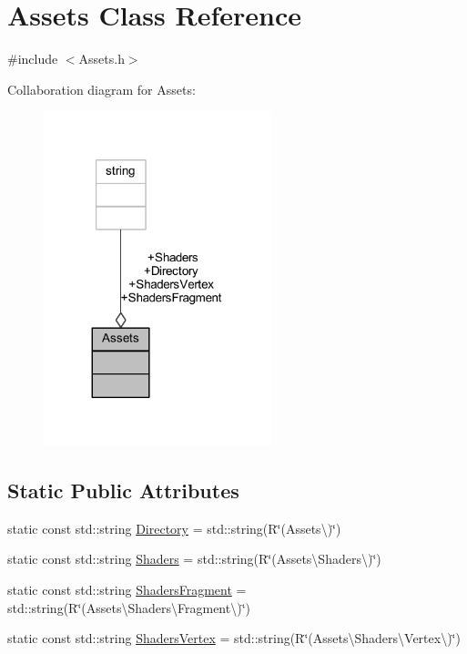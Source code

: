 \hypertarget{classAssets}{}\section{Assets Class Reference}
\label{classAssets}


{\ttfamily \#include $<$Assets.\+h$>$}



Collaboration diagram for Assets\+:
\nopagebreak
\begin{figure}[H]
\begin{center}
\leavevmode
\includegraphics[width=188pt]{classAssets__coll__graph}
\end{center}
\end{figure}
\subsection*{Static Public Attributes}
\begin{DoxyCompactItemize}
\item 
static const std\+::string \mbox{\hyperlink{classAssets_a2b541c116af365350c686285cb115d07}{Directory}} = std\+::string(R\char`\"{}(Assets\textbackslash{})\char`\"{})
\item 
static const std\+::string \mbox{\hyperlink{classAssets_af94075606cda6aef8b4bdcbe17169af3}{Shaders}} = std\+::string(R\char`\"{}(Assets\textbackslash{}\+Shaders\textbackslash{})\char`\"{})
\item 
static const std\+::string \mbox{\hyperlink{classAssets_abb1ca75a8a9c7b942232df4aff9bb6c9}{Shaders\+Fragment}} = std\+::string(R\char`\"{}(Assets\textbackslash{}\+Shaders\textbackslash{}\+Fragment\textbackslash{})\char`\"{})
\item 
static const std\+::string \mbox{\hyperlink{classAssets_ac712d5aca276086a3734e2e9f74cfc6b}{Shaders\+Vertex}} = std\+::string(R\char`\"{}(Assets\textbackslash{}\+Shaders\textbackslash{}\+Vertex\textbackslash{})\char`\"{})
\end{DoxyCompactItemize}


